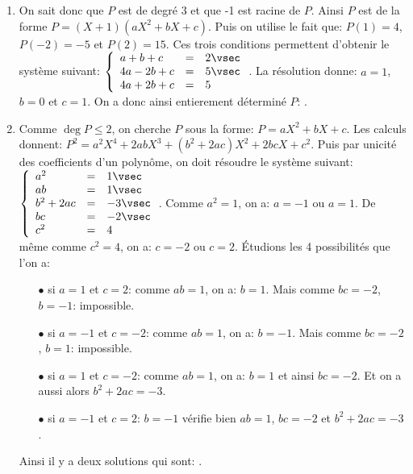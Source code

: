 \documentclass[a4paper, 11pt,reqno]{article}
\begin{document}
\begin{correction}  \;
	\begin{enumerate}
		\item On sait donc que $P$ est de degr\'e 3 et que -1 est racine de $P$. Ainsi $P$ est de la forme $P=(X+1)(aX^2+bX+c)$. Puis on utilise le fait que: $P(1)=4$, $P(-2)=-5$ et $P(2)=15$. Ces trois conditions permettent d'obtenir le syst\`{e}me suivant: $\left\lbrace\begin{array}{lll}  a+b+c&=&2\vsec\\4a-2b+c&=&5\vsec\\4a+2b+c&=&5  \end{array}\right.$. La r\'esolution donne: $a=1$, $b=0$ et $c=1$. On a donc ainsi entierement d\'etermin\'e $P$: .
		\item Comme $\deg{P}\leq 2$, on cherche $P$ sous la forme: $P=aX^2+bX+c$. Les calculs donnent: $P^2=a^2X^4+2ab X^3+(b^2+2ac)X^2+2bcX+c^2$. Puis par unicit\'e des coefficients d'un polyn\^{o}me, on doit r\'esoudre le syst\`{e}me suivant: $\left\lbrace\begin{array}{lll}  a^2&=&1\vsec\\ab&=&1 \vsec\\b^2+2ac&=&-3\vsec\\ bc&=& -2\vsec\\c^2&=&4  \end{array}\right.$. Comme $a^2=1$, on a: $a=-1$ ou $a=1$. De m\^{e}me comme $c^2=4$, on a: $c=-2$ ou $c=2$. \'Etudions les 4 possibilit\'es que l'on a:
		      \begin{itemize}
			      \item[$\bullet$] si $a=1$ et $c=2$: comme $ab=1$, on a: $b=1$. Mais comme $bc=-2$, $b=-1$: impossible.
			      \item[$\bullet$] si $a=-1$ et $c=-2$: comme $ab=1$, on a: $b=-1$. Mais comme $bc=-2$, $b=1$: impossible.
			      \item[$\bullet$] si $a=1$ et $c=-2$: comme $ab=1$, on a: $b=1$ et ainsi $bc=-2$. Et on a aussi alors $b^2+2ac=-3.$
			      \item[$\bullet$] si $a=-1$ et $c=2$: $b=-1$ v\'erifie bien $ab=1$, $bc=-2$ et $b^2+2ac=-3$.
		      \end{itemize}
		      Ainsi il y a deux solutions qui sont: .
	\end{enumerate}
\end{correction}
\end{document}
